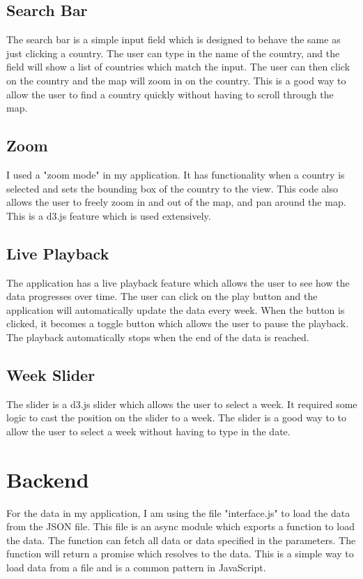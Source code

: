 \documentclass{report}
\begin{document}
\subsection{Search Bar}
The search bar is a simple input field which is designed to behave the same as just clicking a country. The user can type in the name of the country, and the field will show a list of countries which match the input. The user can then click on the country and the map will zoom in on the country. This is a good way to allow the user to find a country quickly without having to scroll through the map.

\subsection{Zoom}
I used a "zoom mode" in my application. It has functionality when a country is selected and sets the bounding box of the country to the view. This code also allows the user to freely zoom in and out of the map, and pan around the map. This is a d3.js feature which is used extensively.

\subsection{Live Playback}
The application has a live playback feature which allows the user to see how the data progresses over time. The user can click on the play button and the application will automatically update the data every week. When the button is clicked, it becomes a toggle button which allows the user to pause the playback. The playback automatically stops when the end of the data is reached.

\subsection{Week Slider}
The slider is a d3.js slider which allows the user to select a week. It required some logic to cast the position on the slider to a week. The slider is a good way to to allow the user to select a week without having to type in the date.

\section{Backend}
For the data in my application, I am using the file "interface.js" to load the data from the JSON file. This file is an async module which exports a function to load the data. The function can fetch all data or data specified in the parameters. The function will return a promise which resolves to the data. This is a simple way to load data from a file and is a common pattern in JavaScript.
\end{document}
